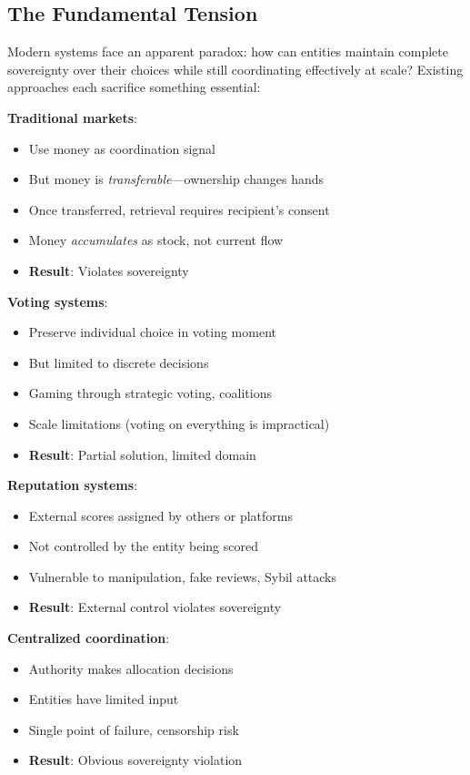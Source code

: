 \documentclass[11pt,a4paper]{article}
\theoremstyle{definition}
\theoremstyle{remark}
\begin{document}
\subsection{The Fundamental Tension}

Modern systems face an apparent paradox: how can entities maintain complete sovereignty over their choices while still coordinating effectively at scale? Existing approaches each sacrifice something essential:

\textbf{Traditional markets}:
\begin{itemize}
\item Use money as coordination signal
\item But money is \textit{transferable}—ownership changes hands
\item Once transferred, retrieval requires recipient's consent
\item Money \textit{accumulates} as stock, not current flow
\item \textbf{Result}: Violates sovereignty
\end{itemize}

\textbf{Voting systems}:
\begin{itemize}
\item Preserve individual choice in voting moment
\item But limited to discrete decisions
\item Gaming through strategic voting, coalitions
\item Scale limitations (voting on everything is impractical)
\item \textbf{Result}: Partial solution, limited domain
\end{itemize}

\textbf{Reputation systems}:
\begin{itemize}
\item External scores assigned by others or platforms
\item Not controlled by the entity being scored
\item Vulnerable to manipulation, fake reviews, Sybil attacks
\item \textbf{Result}: External control violates sovereignty
\end{itemize}

\textbf{Centralized coordination}:
\begin{itemize}
\item Authority makes allocation decisions
\item Entities have limited input
\item Single point of failure, censorship risk
\item \textbf{Result}: Obvious sovereignty violation
\end{itemize}
\end{document}
